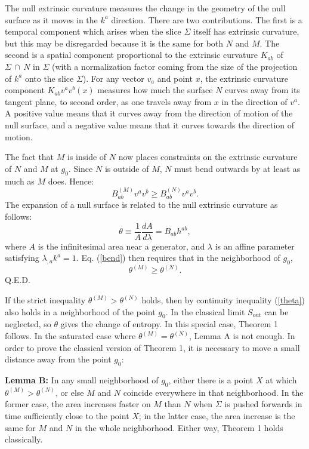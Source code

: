 \documentclass[12pt]{article}
\begin{document}
The null extrinsic curvature measures the change in the geometry of the null surface as it moves in the $k^a$ direction.  There are two contributions.  The first is a temporal component which arises when the slice $\Sigma$ itself has extrinsic curvature, but this may be disregarded because it is the same for both $N$ and $M$.  The second is a spatial component proportional to the extrinsic curvature $K_{ab}$  of $\Sigma\,\cap\,N$ in $\Sigma$ (with a normalization factor coming from the size of the projection of $k^a$ onto the slice $\Sigma$).  For any vector $v_a$ and point $x$, the extrinsic curvature component $K_{ab} v^a v^b (x)$ measures how much the surface $N$ curves away from its tangent plane, to second order, as one travels away from $x$ in the direction of $v^a$.  A positive value means that it curves away from the direction of motion of the null surface, and a negative value means that it curves towards the direction of motion.  

The fact that $M$ is inside of $N$ now places constraints on the extrinsic curvature of $N$ and $M$ at $g_0$.  Since $N$ is outside of $M$, $N$ must bend outwards by at least as much as $M$ does.  Hence:
\begin{equation}\label{bend}
B_{ab}^{(M)} v^a v^b \ge B_{ab}^{(N)} v^a v^b.
\end{equation}
The expansion of a null surface is related to the null extrinsic curvature as follows:
\begin{equation}\label{exp}
\theta \equiv \frac{1}{A}\frac{dA}{d\lambda} = B_{ab} h^{ab},
\end{equation}
where $A$ is the infinitesimal area near a generator, and $\lambda$ is an affine parameter satisfying $\lambda_{,a} k^a = 1$.  Eq. (\ref{bend}) then requires that in the neighborhood of $g_0$,
\begin{equation}\label{theta}
\theta^{(M)} \ge \theta^{(N)}.
\end{equation}
Q.E.D.

If the strict inequality $\theta^{(M)} > \theta^{(N)}$ holds, then by continuity inequality (\ref{theta}) also holds in a neighborhood of the point $g_0$.  In the classical limit $S_\mathrm{out}$ can be neglected, so $\theta$ gives the change of entropy.  In this special case, Theorem 1 follows.  In the saturated case where $\theta^{(M)} = \theta^{(N)}$, Lemma A is not enough.  In order to prove the classical version of Theorem 1, it is necessary to move a small distance away from the point $g_0$:

\textbf{Lemma B:} In any small neighborhood of $g_0$, either there is a point $X$ at which $\theta^{(M)} > \theta^{(N)}$, or else $M$ and $N$ coincide everywhere in that neighborhood.  In the former case, the area increases faster on $M$ than $N$ when $\Sigma$ is pushed forwards in time sufficiently close to the point $X$; in the latter case, the area increase is the same for $M$ and $N$ in the whole neighborhood.  Either way, Theorem 1 holds classically.
\end{document}
